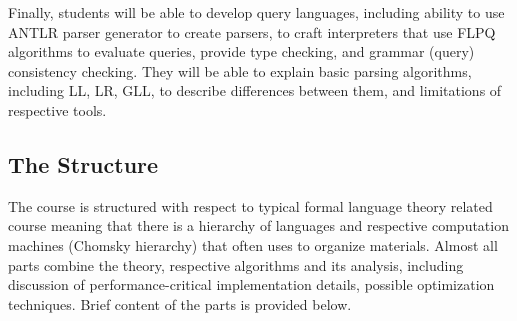 \documentclass[sigconf]{acmart}
\begin{document}
Finally, students will be able to develop query languages, including ability to use ANTLR parser generator to create parsers, to craft interpreters that use FLPQ algorithms to evaluate queries, provide type checking, and grammar (query) consistency checking. 
They will be able to explain basic parsing algorithms, including LL, LR, GLL, to describe differences between them, and limitations of respective tools. 


\subsection{The Structure}

The course is structured with respect to typical formal language theory related course meaning that there is a hierarchy of languages and respective computation machines (Chomsky hierarchy) that often uses to organize materials. 
Almost all parts combine the theory, respective algorithms and its analysis, including discussion of performance-critical implementation details, possible optimization techniques. 
Brief content of the parts is provided below.
\end{document}
